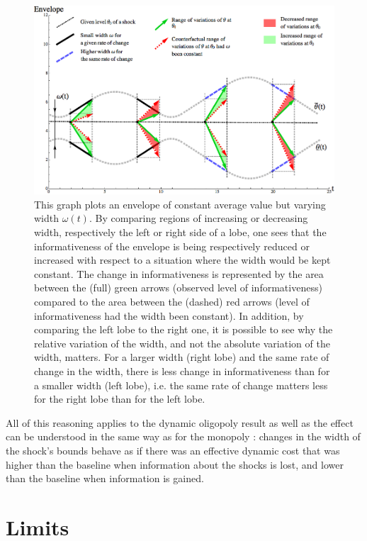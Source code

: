 \begin{figure}[h] 
\centering
\includegraphics[width=15cm]{figch1/figdyn1.png}
\caption{\small{This graph plots an envelope of constant average value but varying width $\omega(t)$. By comparing regions of increasing or decreasing width, respectively the left or right side of a lobe, one sees that the informativeness of the envelope is being respectively reduced or increased with respect to a situation where the width would be kept constant. The change in informativeness is represented by the area between the (full) green arrows (observed level of informativeness) compared to the area between the (dashed) red arrows (level of informativeness had the width been constant). In addition, by comparing the left lobe to the right one, it is possible to see why the relative variation of the width, and not the absolute variation of the width, matters. For a larger width (right lobe) and the same rate of change in the width, there is less change in informativeness than for a smaller width (left lobe), i.e. the same rate of change matters less for the right lobe than for the left lobe. }} \label{figdyn1}
\end{figure}

All of this reasoning applies to the dynamic oligopoly result as well as the effect can be understood in the same way as for the monopoly : changes in the width of the shock's bounds behave as if there was an effective dynamic cost that was higher than the baseline when information about the shocks is lost, and lower than the baseline when information is gained.

\section{Limits}\label{limits}

